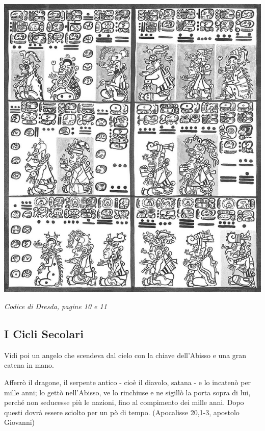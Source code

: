\vfill

\begin{center}
\includegraphics[width=0.5\linewidth]{immagini/Laminas_8_y_9_del_Codice_de_Dresden2.png}

\medskip

\emph{Codice di Dresda, pagine 10 e 11}
\end{center}


\pagebreak



\subsection{I Cicli Secolari}

\begin{changemargin}{0.3cm}{0.3cm}\begin{enfasi}{
Vidi poi un angelo che scendeva dal cielo con la chiave dell'Abisso e una gran catena in mano.

Afferrò il dragone, il serpente antico - cioè il diavolo, satana - e lo incatenò per mille anni; lo gettò nell'Abisso, ve lo rinchiuse e ne sigillò la porta sopra di lui, perché non seducesse più le nazioni, fino al compimento dei mille anni. Dopo questi dovrà essere sciolto per un pò di tempo. (Apocalisse 20,1-3, apostolo Giovanni)
}\end{enfasi}\end{changemargin}\medskip

